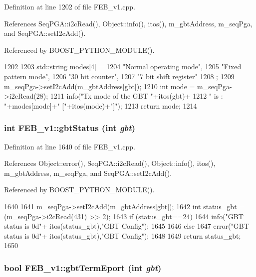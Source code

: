 Definition at line 1202 of file FEB\_\-v1.cpp.

References SeqPGA::i2cRead(), Object::info(), itos(), m\_\-gbtAddress, m\_\-seqPga, and SeqPGA::setI2cAdd().

Referenced by BOOST\_\-PYTHON\_\-MODULE().


\begin{DoxyCode}
1202                             {
1203   std::string modes[4] = {
1204     "Normal operating mode",
1205     "Fixed pattern mode",
1206     "30 bit counter",
1207     "7 bit shift register"
1208   };
1209   m_seqPga->setI2cAdd(m_gbtAddress[gbt]);
1210   int mode = m_seqPga->i2cRead(28);
1211   info("Tx mode of the GBT "+itos(gbt)+
1212        " is : "+modes[mode]+" ["+itos(mode)+"]");
1213   return mode; 
1214 }
\end{DoxyCode}
\hypertarget{classFEB__v1_a7b47a1b2c7af459b211eed59f4dbe9a7}{
\subsubsection[{gbtStatus}]{\setlength{\rightskip}{0pt plus 5cm}int FEB\_\-v1::gbtStatus (int {\em gbt})}}
\label{classFEB__v1_a7b47a1b2c7af459b211eed59f4dbe9a7}


Definition at line 1640 of file FEB\_\-v1.cpp.

References Object::error(), SeqPGA::i2cRead(), Object::info(), itos(), m\_\-gbtAddress, m\_\-seqPga, and SeqPGA::setI2cAdd().

Referenced by BOOST\_\-PYTHON\_\-MODULE().


\begin{DoxyCode}
1640                             {
1641   m_seqPga->setI2cAdd(m_gbtAddress[gbt]);
1642   int status_gbt = (m_seqPga->i2cRead(431) >> 2);
1643   if (status_gbt==24){
1644     info("GBT status is 0d"+ itos(status_gbt),"GBT Config");
1645   }
1646   else {
1647     error("GBT status is 0d"+ itos(status_gbt),"GBT Config");
1648   }
1649   return status_gbt;
1650 }
\end{DoxyCode}
\hypertarget{classFEB__v1_a84fa302a012eee663fe21829866fb20e}{
\subsubsection[{gbtTermEport}]{\setlength{\rightskip}{0pt plus 5cm}bool FEB\_\-v1::gbtTermEport (int {\em gbt})}}
\label{classFEB__v1_a84fa302a012eee663fe21829866fb20e}


